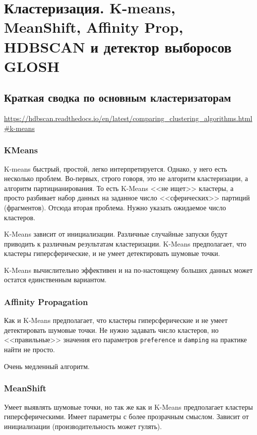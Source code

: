 \documentclass[%
	11pt,
	a4paper,
	utf8,
		]{article}
\begin{document}
\section{Кластеризация. K-means, MeanShift, Affinity Prop, HDBSCAN и детектор выборосов GLOSH}

\subsection{Краткая сводка по основным кластеризаторам}

\url{https://hdbscan.readthedocs.io/en/latest/comparing_clustering_algorithms.html#k-means}

\subsubsection{KMeans}

K-means быстрый, простой, легко интерпретируется. Однако, у него есть несколько проблем. Во-первых, строго говоря, это не алгоритм кластеризации, а алгоритм партицианирования. То есть K-Means <<не ищет>> кластеры, а просто разбивает набор данных на заданное число <<сферических>> партиций (фрагментов). Отсюда вторая проблема. Нужно указать ожидаемое число кластеров.

K-Means зависит от инициализации. Различные случайные запуски будут приводить к различным результатам кластеризации. K-Means предполагает, что кластеры гиперсферические, и не умеет детектировать шумовые точки.

K-Means вычислительно эффективен и на по-настоящему больших данных может остатся единственным вариантом.

\subsubsection{Affinity Propagation}

Как и K-Means предполагает, что кластеры гиперсферические и не умеет детектировать шумовые точки. Не нужно задавать число кластеров, но <<правильные>> значения его параметров \texttt{preference} и \texttt{damping} на практике найти не просто.

Очень медленный алгоритм.

\subsubsection{MeanShift}

Умеет выявлять шумовые точки, но так же как и K-Means предполагает кластеры гиперсферическими. Имеет параметры с более прозрачным смыслом. Зависит от инициализации (производительность может гулять).
\end{document}
